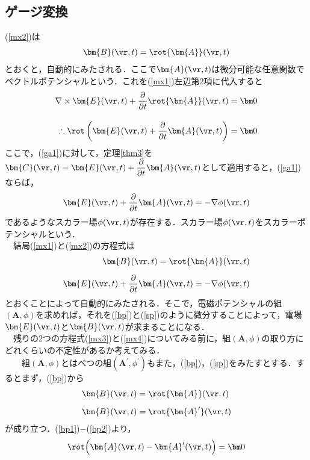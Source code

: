 %
\subsection{ゲージ変換}
(\ref{mx2})は
\begin{align}
\bm{B}(\vr,t)=\rot{\bm{A}}(\vr,t)
\end{align}
とおくと，自動的にみたされる．ここで${\bm{A}}(\vr,t)$は微分可能な任意関数でベクトルポテンシャルという．これを(\ref{mx1})左辺第2項に代入すると
\begin{align}
\label{ga1}
\nabla\times\bm{E}(\vr,t)+\dfrac{\partial}{\partial t}\rot{\bm{A}}(\vr,t)&=\bm 0\notag\\[10pt]
\therefore\rot\left(\bm{E}(\vr,t)+\dfrac{\partial}{\partial t}{\bm{A}}(\vr,t)\right)&=\bm 0
\end{align}
ここで，(\ref{ga1})に対して，定理\ref{thm3}を$\bm{C}(\vr,t)=\bm{E}(\vr,t)+\dfrac{\partial}{\partial t}{\bm{A}}(\vr,t)$として適用すると，(\ref{ga1})ならば，
\begin{align}
\bm{E}(\vr,t)+\dfrac{\partial}{\partial t}{\bm{A}}(\vr,t)=-\nabla\phi(\vr,t)
\end{align}
であるようなスカラー場$\phi(\vr,t)$が存在する．スカラー場$\phi(\vr,t)$をスカラーポテンシャルという．\\
　結局(\ref{mx1})と(\ref{mx2})の方程式は
\begin{align}
\label{bp}
\bm{B}(\vr,t)=\rot{\bm{A}}(\vr,t)\\[5pt]
\label{sp}
\bm{E}(\vr,t)+\dfrac{\partial}{\partial t}{\bm{A}}(\vr,t)=-\nabla\phi(\vr,t)
\end{align}
とおくことによって自動的にみたされる．そこで，電磁ポテンシャルの組$({\bm{A}},\phi)$を求めれば，それを(\ref{bp})と(\ref{sp})のように微分することによって，電場$\bm{E}(\vr,t)$と$\bm{B}(\vr,t)$が求まることになる．\\
%
%
%
%
　残りの2つの方程式(\ref{mx3})と(\ref{mx4})についてみる前に，組$({\bm{A}},\phi)$の取り方にどれくらいの不定性があるか考えてみる．\\
　　組$({\bm{A}},\phi)$とはべつの組$({\bm{A}^{\prime}},{\phi^\prime})$もまた，(\ref{bp})，(\ref{sp})をみたすとする．するとまず，(\ref{bp})から
\begin{align}
\label{bp1}
\bm{B}(\vr,t)&=\rot{\bm{A}}(\vr,t)\\[5pt]
\label{bp2}
\bm{B}(\vr,t)&=\rot{\bm{A}^{\prime}}(\vr,t)
\end{align}
が成り立つ．(\ref{bp1})$-$(\ref{bp2})より，
\begin{align}
\label{ga2}
\rot\Bigl({\bm{A}}(\vr,t)-{\bm{A}^{\prime}}(\vr,t)\Bigr)=\bm0
\end{align}
